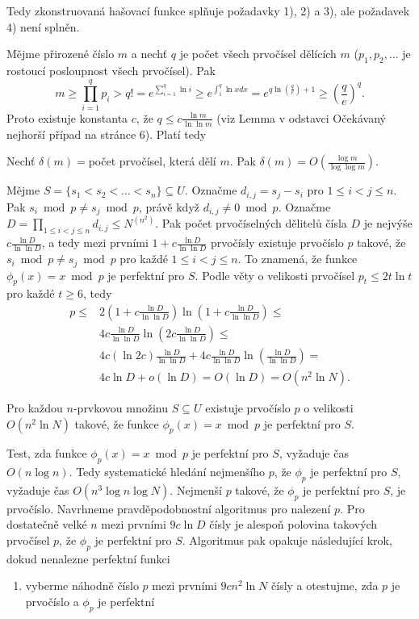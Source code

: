 \documentclass[a4paper,12pt]{article}
\begin{document}
Tedy zkonstruovaná hašovací funkce splňuje požadavky 
1), 2) a 3), ale požadavek 4) není splněn. 

Mějme přirozené číslo $m$ a nechť $q$ je počet všech prvočísel 
dělících $m$ ($p_1,p_2,\dots$ je rostoucí posloupnost všech 
prvočísel). Pak
$$m\ge\prod_{i=1}^qp_i>q!=e^{\sum_{i=1}^q\ln i}\ge e^{\int_1^q\ln 
xdx}=e^{q\ln(\frac qe)+1}\ge (\frac qe)^q.$$
Proto existuje konstanta $c$, že $q\le c\frac {\ln m}{\ln\ln m}$ (viz Lemma v odstavci Očekávaný 
nejhorší případ na stránce 6). Platí tedy  
\begin{veta}Nechť $\delta (m)=$počet prvočísel, která dělí 
$m$. Pak $\delta (m)=O(\frac {\log m}{\log\log m})$.
\end{veta}

Mějme $S=\{s_1<s_2<\dots<s_n\}\subseteq U$. Označme 
$d_{i,j}=s_j-s_i$ pro $1\le i<j\le n$. Pak $s_i\bmod p\ne s_j\bmod 
p$, 
právě když $d_{i,j}\ne 0\bmod p$. Označme 
$D=\prod_{1\le i<j\le n}d_{i,j}\le N^{(n^2)}$. Pak počet prvočíselných 
dělitelů čísla $D$ je nejvýše $c\frac {\ln 
D}{\ln\ln D}$, a tedy mezi 
prvními $1+c\frac {\ln D}{\ln\ln D}$ prvočísly existuje prvočíslo $
p$ 
takové, že $s_i\bmod p\ne s_j\bmod p$ pro každé $1\le i
<j\le n$. 
To znamená, že funkce $\phi_p(x)=x\bmod p$ je perfektní pro 
$S$. Podle věty o velikosti prvočísel $p_t\le 2t\ln t$ pro každé $
t\ge 6$, tedy
\begin{align*} p\le&2(1+c\frac {\ln D}{\ln\ln D})\ln(1+c\frac {\ln D}{\ln\ln 
D})\le\\
&4c\frac {\ln D}{\ln\ln D}\ln(2c\frac {\ln D}{\ln\ln D})\le\\
&4c(\ln2c)\frac {\ln D}{\ln\ln D}+4c\frac {\ln D}{\ln\ln D}\ln(\frac {\ln 
D}{\ln\ln D})=\\
&4c\ln D+o(\ln D)=O(\ln D)=O(n^2\ln N).\end{align*}

\begin{veta}Pro každou $n$-prvkovou množinu $S\subseteq 
U$ 
existuje prvo\-čís\-lo $p$ o velikosti $O(n^2\ln N)$ takové, že 
funkce $\phi_p(x)=x\bmod p$ je perfektní pro $S$.  
\end{veta}

Test, zda funkce $\phi_p(x)=x\bmod p$ je perfektní 
pro $S$, 
vyžaduje čas $O(n\log n)$. Tedy systematické hledání 
nejmenšího $p$, že $\phi_p$ je perfektní pro $S$, vyžaduje čas 
$O(n^3\log n\log N)$. Nejmenší $p$ takové, že $\phi_p$ je perfektní 
pro $S$, 
je prvočíslo. Navrhneme pravděpodob\-nostní algoritmus 
pro nalezení $p$. Pro dostatečně velké $n$ mezi 
prvními $9c\ln D$ čísly je alespoň polovina tako\-vých 
prvočísel $p$, že $\phi_p$ je perfektní pro $S$. Algoritmus pak 
opakuje následující krok, dokud nenalezne perfektní funkci
\begin{enumerate}
\item 
vyberme náhodně číslo $p$ mezi prvními $9cn^2\ln 
N$ 
čísly a otestujme, zda $p$ je prvočíslo a $\phi_p$ je perfektní
\end{enumerate}
\end{document}
